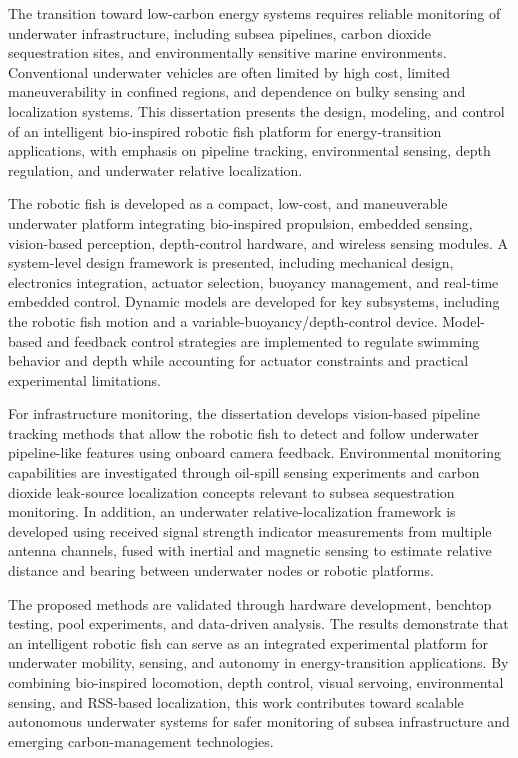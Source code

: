 \documentclass{uhcoethesis}
\begin{document}
\begin{abstractpage}
The transition toward low-carbon energy systems requires reliable monitoring of underwater infrastructure, including subsea pipelines, carbon dioxide sequestration sites, and environmentally sensitive marine environments. Conventional underwater vehicles are often limited by high cost, limited maneuverability in confined regions, and dependence on bulky sensing and localization systems. This dissertation presents the design, modeling, and control of an intelligent bio-inspired robotic fish platform for energy-transition applications, with emphasis on pipeline tracking, environmental sensing, depth regulation, and underwater relative localization.

The robotic fish is developed as a compact, low-cost, and maneuverable underwater platform integrating bio-inspired propulsion, embedded sensing, vision-based perception, depth-control hardware, and wireless sensing modules. A system-level design framework is presented, including mechanical design, electronics integration, actuator selection, buoyancy management, and real-time embedded control. Dynamic models are developed for key subsystems, including the robotic fish motion and a variable-buoyancy/depth-control device. Model-based and feedback control strategies are implemented to regulate swimming behavior and depth while accounting for actuator constraints and practical experimental limitations.

For infrastructure monitoring, the dissertation develops vision-based pipeline tracking methods that allow the robotic fish to detect and follow underwater pipeline-like features using onboard camera feedback. Environmental monitoring capabilities are investigated through oil-spill sensing experiments and carbon dioxide leak-source localization concepts relevant to subsea sequestration monitoring. In addition, an underwater relative-localization framework is developed using received signal strength indicator measurements from multiple antenna channels, fused with inertial and magnetic sensing to estimate relative distance and bearing between underwater nodes or robotic platforms.

The proposed methods are validated through hardware development, benchtop testing, pool experiments, and data-driven analysis. The results demonstrate that an intelligent robotic fish can serve as an integrated experimental platform for underwater mobility, sensing, and autonomy in energy-transition applications. By combining bio-inspired locomotion, depth control, visual servoing, environmental sensing, and RSS-based localization, this work contributes toward scalable autonomous underwater systems for safer monitoring of subsea infrastructure and emerging carbon-management technologies.
\end{abstractpage}
\end{document}
